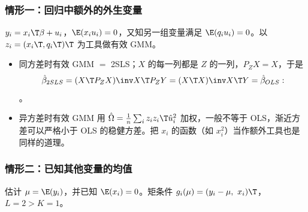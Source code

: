 \subsubsection{情形一：回归中额外的外生变量}

$y_i=x_i\T\beta+u_i$，$\E(x_iu_i)=0$，又知另一组变量满足 $\E(q_iu_i)=0$。以 $z_i=(x_i\T,q_i\T)\T$ 为工具做有效 GMM。
\begin{itemize}
  \item 同方差时有效 GMM $=$ 2SLS；$X$ 的每一列都是 $Z$ 的一列，$P_ZX=X$，于是
  \[
  \hat\beta_{2SLS}=(X\T P_ZX)\inv X\T P_ZY=(X\T X)\inv X\T Y=\hat\beta_{OLS} :
  \]
  。
  \item 异方差时有效 GMM 用 $\hat\Omega=\frac1n\sum_iz_iz_i\T\hat u_i^2$ 加权，一般不等于 OLS，渐近方差可以严格小于 OLS 的稳健方差。把 $x_i$ 的函数（如 $x_i^2$）当作额外工具也是同样的道理。
\end{itemize}

\subsubsection{情形二：已知其他变量的均值}

估计 $\mu=\E(y_i)$，并已知 $\E(x_i)=0$。矩条件 $g_i(\mu)=(y_i-\mu,\ x_i)\T$，$L=2>K=1$。

